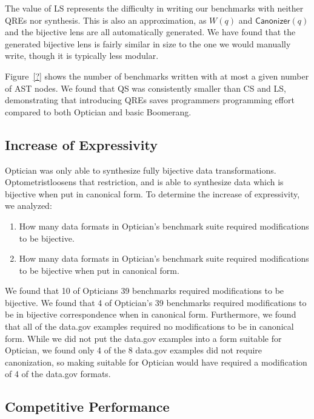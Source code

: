 \documentclass{svproc}
\newcommand{\kw}[1]{\ensuremath{\mathsf{#1}}}
\newcommand{\canonizer}{\ensuremath{\kw{Canonizer}}}
\newcommand{\Name}{Optometrist}
\newcommand{\QRESize}{QS}
\newcommand{\CanonizerAndSpecSize}{CS}
\newcommand{\LensAndSpecSize}{LS}
\begin{document}
The value of \LensAndSpecSize{} represents the difficulty in writing our benchmarks
with neither QREs nor synthesis.  This is also an approximation, as $W(q)$ and
$\canonizer(q)$ and the bijective lens are all automatically generated.
We have found that the generated bijective lens is fairly similar in size to the
one we would manually write, though it is typically less modular.

Figure~\ref{?} shows the number of benchmarks written with at most a given
number of AST nodes.  We found that \QRESize{} was consistently smaller than
\CanonizerAndSpecSize{} and \LensAndSpecSize{}, demonstrating that introducing
QREs saves programmers programming effort compared to both Optician and basic
Boomerang.

\subsection{Increase of Expressivity}

Optician was only able to synthesize fully bijective data transformations.
\Name loosens that restriction, and is able to synthesize data which is
bijective when put in canonical form.
To determine the increase of expressivity, we analyzed:
\begin{enumerate}
\item How many data formats in Optician's benchmark suite required modifications
  to be bijective.
\item How many data formats in Optician's benchmark suite required modifications
  to be bijective when put in canonical form.
\end{enumerate}

We found that 10 of Opticians 39 benchmarks required modifications to be
bijective. We found that 4 of Optician's 39
benchmarks required modifications to be in bijective correspondence when in
canonical form.  Furthermore, we found that all of the data.gov examples
required no modifications to be in canonical form.  While we did not put the
data.gov examples into a form suitable for Optician, we found only 4 of
the 8 data.gov examples did not require canonization, so making suitable
for Optician would have required a modification of 4 of the data.gov
formats.

\subsection{Competitive Performance}
\end{document}
